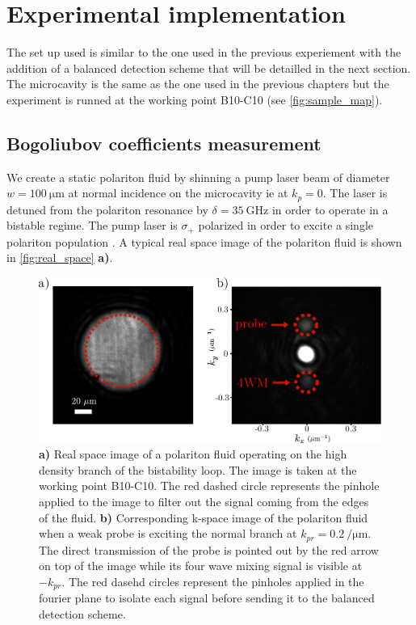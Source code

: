 \section{Experimental implementation}
\label{sec:exp_impl}

The set up used is similar to the one used in the previous experiement with the addition of a balanced detection scheme that will be detailled in the next section. 
The microcavity is the same as the one used in the previous chapters but the experiment is runned at the working point B10-C10 (see \autoref{fig:sample_map}).

\bigskip

\subsection{Bogoliubov coefficients measurement}


We create a static polariton fluid by shinning a pump laser beam of diameter $w=\SI{100}{\micro\meter}$ at normal incidence on the microcavity ie at $k_p=0$. The laser is detuned from the polariton resonance by
$\delta = \SI{35}{\giga\hertz}$ in order to operate in a bistable regime. The pump laser is $\sigma_+$ polarized in order to excite a single polariton population \cite{timofeev_exciton_2012}. A typical real space image of the polariton fluid is shown in \autoref{fig:real_space} \textbf{a)}. 


\begin{figure}
    \centering
    \includegraphics[width=1\textwidth]{chap_correlation/fig/r_and_k_space.pdf}
    \caption{\textbf{a)} Real space image of a polariton fluid operating on the high density branch of the bistability loop. The image is taken at the working point B10-C10. The red dashed circle represents
    the pinhole applied to the image to filter out the signal coming from the edges of the fluid. \textbf{b)} Corresponding k-space image of the polariton fluid when a weak probe is exciting the normal branch at $k_{pr}=\SI{0.2}{\per\micro\meter}$. 
    The direct transmission of the probe is pointed out by the red arrow on top of the image while its four wave mixing signal is visible at $-k_{pr}$. The red dasehd circles represent the pinholes applied 
    in the fourier plane to isolate each signal before sending it to the balanced detection scheme. }
    \label{fig:real_space}
\end{figure}


